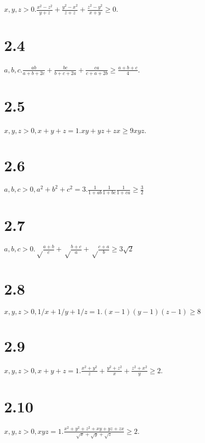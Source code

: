 \documentclass{article}
\begin{document}
$x, y, z > 0. \frac{x^2 - z^2}{y + z} + \frac{y^2 - x^2}{z + z} + \frac{z^2 - y^2}{x + y} \ge 0$.

\section*{2.4}

$a, b, c. \frac{ab}{a + b + 2c} + \frac{bc}{b + c + 2a} + \frac{ca}{c + a + 2b} \ge \frac{a+b+c}{4}$.

\section*{2.5}

$x, y, z > 0, x + y + z = 1. xy + yz + zx \ge 9xyz$.

\section*{2.6}

$a, b, c > 0, a^2 + b^2 + c^2 = 3. \frac{1}{1 + ab} \frac{1}{1 + bc} \frac{1}{1 + ca} \ge \frac{3}{2}$

\section*{2.7}

$a, b, c > 0. \sqrt\frac{a+b}{c} + \sqrt\frac{b+c}{a} + \sqrt\frac{c+a}{b} \ge 3\sqrt 2$

\section*{2.8}

$x, y, z > 0, 1/x + 1/y + 1/z = 1. (x-1)(y-1)(z-1) \ge 8$

\section*{2.9}

$x, y, z > 0, x + y + z = 1. \frac{x^2 + y^2}{z} + \frac{y^2 + z^2}{x} + \frac{z^2 + x^2}{y} \ge 2$.

\section*{2.10}

$x, y, z > 0, xyz = 1. \frac{x^2 + y^2 + z^2 + xy + yz + zx}{\sqrt{x}+\sqrt{y}+\sqrt{z}} \ge 2$.
\end{document}
